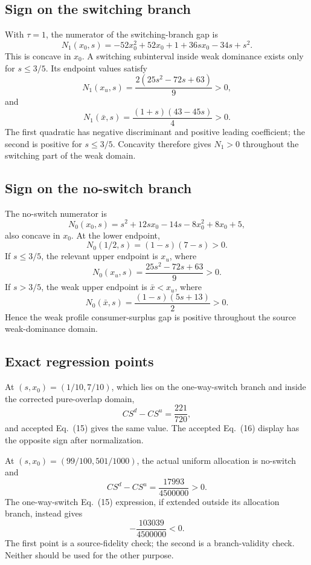 \subsection{Sign on the switching branch}

With \(\tau=1\), the numerator of the switching-branch gap is
\[
N_1(x_0,s)
=
-52x_0^2+52x_0+1+36sx_0-34s+s^2.
\]
This is concave in \(x_0\). A switching subinterval inside weak dominance exists only for \(s\le3/5\). Its endpoint values satisfy
\[
N_1(x_u,s)
=
\frac{2(25s^2-72s+63)}9>0,
\]
and
\[
N_1(\bar x,s)
=
\frac{(1+s)(43-45s)}4>0.
\]
The first quadratic has negative discriminant and positive leading coefficient; the second is positive for \(s\le3/5\). Concavity therefore gives \(N_1>0\) throughout the switching part of the weak domain.

\subsection{Sign on the no-switch branch}

The no-switch numerator is
\[
N_0(x_0,s)
=
s^2+12sx_0-14s-8x_0^2+8x_0+5,
\]
also concave in \(x_0\). At the lower endpoint,
\[
N_0(1/2,s)=(1-s)(7-s)>0.
\]
If \(s\le3/5\), the relevant upper endpoint is \(x_u\), where
\[
N_0(x_u,s)
=
\frac{25s^2-72s+63}{9}>0.
\]
If \(s>3/5\), the weak upper endpoint is \(\bar x<x_u\), where
\[
N_0(\bar x,s)
=
\frac{(1-s)(5s+13)}2>0.
\]
Hence the weak profile consumer-surplus gap is positive throughout the source weak-dominance domain.

\subsection{Exact regression points}

At \((s,x_0)=(1/10,7/10)\), which lies on the one-way-switch branch and inside the corrected pure-overlap domain,
\[
CS^d-CS^u=\frac{221}{720},
\]
and accepted Eq.~(15) gives the same value. The accepted Eq.~(16) display has the opposite sign after normalization.

At \((s,x_0)=(99/100,501/1000)\), the actual uniform allocation is no-switch and
\[
CS^d-CS^u=\frac{17993}{4500000}>0.
\]
The one-way-switch Eq.~(15) expression, if extended outside its allocation branch, instead gives
\[
-\frac{103039}{4500000}<0.
\]
The first point is a source-fidelity check; the second is a branch-validity check. Neither should be used for the other purpose.
